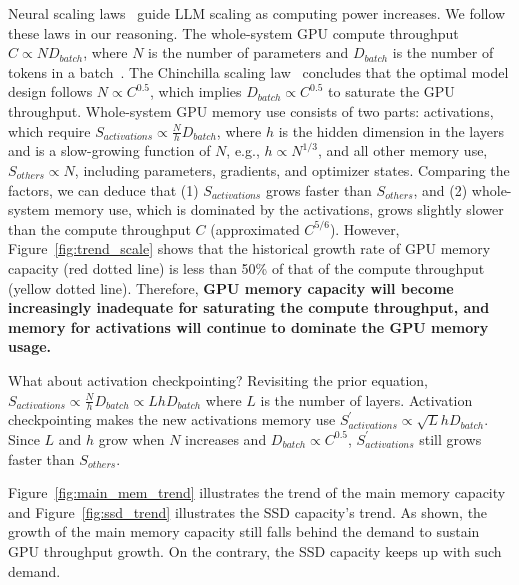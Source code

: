 Neural scaling laws~\cite{jordanhoffmannTrainingComputeOptimalLarge2022,kaplanScalingLawsNeural2020,mccandlishEmpiricalModelLargeBatch2018} guide LLM scaling as computing power increases. We follow these laws in our reasoning.
The whole-system GPU compute throughput $C\propto ND_{batch}$, where $N$ is the number of parameters and $D_{batch}$ is the number of tokens in a batch~\cite{brown2020languagemodelsfewshotlearners}. The Chinchilla scaling law~\cite{jordanhoffmannTrainingComputeOptimalLarge2022} concludes that the optimal model design follows $N\propto C^{0.5}$, which implies $D_{batch}\propto C^{0.5}$ to saturate the GPU throughput.  Whole-system GPU memory use consists of two parts: activations, which require $S_{activations}\propto \frac{N}{h}D_{batch}$, where $h$ is the hidden dimension in the layers and is a slow-growing function of $N$, e.g., $h\propto N^{1/3}$, and all other memory use, $S_{others}\propto N$, including parameters, gradients, and optimizer states. Comparing the factors, we can deduce that (1) $S_{activations}$ grows faster than $S_{others}$, and (2) whole-system memory use, which is dominated by the activations, grows %
slightly slower than the compute throughput $C$ (approximated $C^{5/6}$).
However, Figure~\ref{fig:trend_scale} shows that the historical growth rate of GPU memory capacity (red dotted line) is less than 50\% of that of the compute throughput (yellow dotted line). Therefore, \textbf{GPU memory capacity will become increasingly inadequate for saturating the compute throughput, and memory for activations will continue to dominate the GPU memory usage.} 


What about activation checkpointing? Revisiting the prior equation, $S_{activations}\propto \frac{N}{h}D_{batch}\propto LhD_{batch}$ where $L$ is the number of layers. Activation checkpointing makes the new activations memory use $S_{activations}^\prime \propto \sqrt{L}hD_{batch}$. Since $L$ and $h$ grow when $N$ increases and $D_{batch}\propto C^{0.5}$, $S_{activations}^\prime$ still grows faster than $S_{others}$.

Figure~\ref{fig:main_mem_trend} illustrates the trend of the main memory capacity and Figure~\ref{fig:ssd_trend} illustrates the SSD capacity's trend. As shown, the growth of the main memory capacity still falls behind the demand to sustain GPU throughput growth. On the contrary, the SSD capacity  keeps up with such demand.







